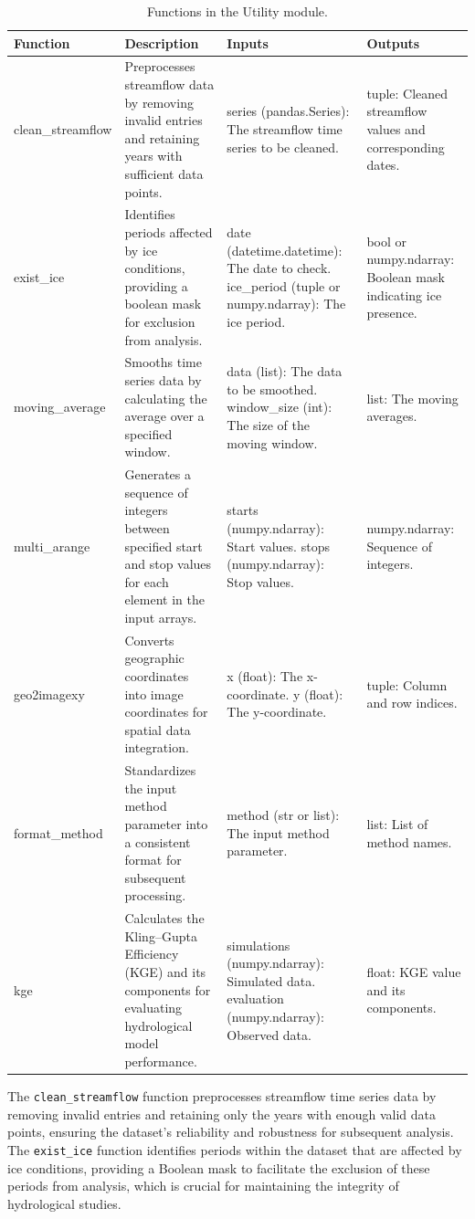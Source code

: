 \documentclass[hydrology,article,submit,pdftex,moreauthors]{Definitions/mdpi}
\begin{document}
\begin{table}[H]
\caption{Functions in the Utility module.\label{tab:utility}}
\small
\begin{tabularx}{\textwidth}{lXXX}
\toprule
\textbf{Function} & \textbf{Description} & \textbf{Inputs} & \textbf{Outputs} \\
\midrule
clean\_streamflow & Preprocesses streamflow data by removing invalid entries and retaining years with sufficient data points. & series (pandas.Series): The streamflow time series to be cleaned. & tuple: Cleaned streamflow values and corresponding dates. \\
\addlinespace
exist\_ice & Identifies periods affected by ice conditions, providing a boolean mask for exclusion from analysis. & date (datetime.datetime): The date to check. ice\_period (tuple or numpy.ndarray): The ice period. & bool or numpy.ndarray: Boolean mask indicating ice presence. \\
\addlinespace
moving\_average & Smooths time series data by calculating the average over a specified window. & data (list): The data to be smoothed. window\_size (int): The size of the moving window. & list: The moving averages. \\
\addlinespace
multi\_arange & Generates a sequence of integers between specified start and stop values for each element in the input arrays. & starts (numpy.ndarray): Start values. stops (numpy.ndarray): Stop values. & numpy.ndarray: Sequence of integers. \\
\addlinespace
geo2imagexy & Converts geographic coordinates into image coordinates for spatial data integration. & x (float): The x-coordinate. y (float): The y-coordinate. & tuple: Column and row indices. \\
\addlinespace
format\_method & Standardizes the input method parameter into a consistent format for subsequent processing. & method (str or list): The input method parameter. & list: List of method names. \\
\addlinespace
kge & Calculates the Kling--Gupta Efficiency (KGE) and its components for evaluating hydrological model performance. & simulations (numpy.ndarray): Simulated data. evaluation (numpy.ndarray): Observed data. & float: KGE value and its components. \\
\bottomrule
\end{tabularx}
\end{table}

The \texttt{clean\_streamflow} function preprocesses streamflow time series data by removing invalid entries and retaining only the years with enough valid data points, ensuring the dataset's reliability and robustness for subsequent analysis. The \texttt{exist\_ice} function identifies periods within the dataset that are affected by ice conditions, providing a Boolean mask to facilitate the exclusion of these periods from analysis, which is crucial for maintaining the integrity of hydrological studies.
\end{document}
